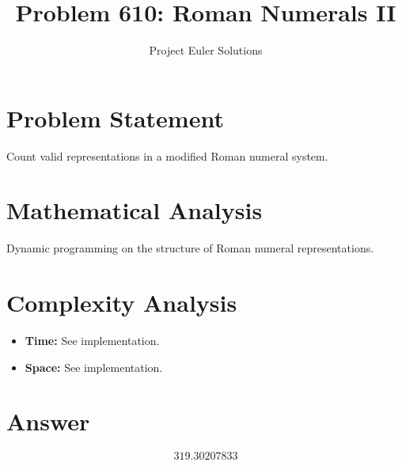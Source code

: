 \documentclass[11pt]{article}
\title{Problem 610: Roman Numerals II}
\author{Project Euler Solutions}
\date{}
\begin{document}
\maketitle

\section{Problem Statement}
Count valid representations in a modified Roman numeral system.

\section{Mathematical Analysis}
Dynamic programming on the structure of Roman numeral representations.

\section{Complexity Analysis}
\begin{itemize}
    \item \textbf{Time:} See implementation.
    \item \textbf{Space:} See implementation.
\end{itemize}

\section{Answer}

\[
\boxed{319.30207833}
\]
\end{document}
